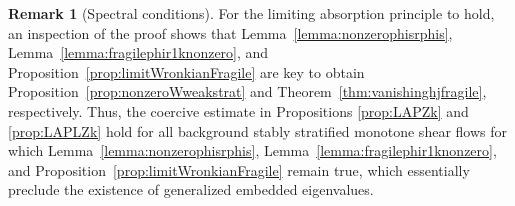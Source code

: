 \documentclass[11pt,reqno]{amsproc}
\theoremstyle{definition}
\newtheorem{remark}[proposition]{Remark}
\numberwithin{equation}{section}
\begin{document}
\begin{remark}[Spectral conditions]
For the limiting absorption principle to hold, an inspection of the proof shows that Lemma~\ref{lemma:nonzerophisrphis}, Lemma~\ref{lemma:fragilephir1knonzero}, and Proposition~\ref{prop:limitWronkianFragile} are key to obtain Proposition~\ref{prop:nonzeroWweakstrat} and Theorem~\ref{thm:vanishinghjfragile}, respectively. Thus, the coercive estimate in Propositions \ref{prop:LAPZk} and \ref{prop:LAPLZk} hold for all background stably stratified monotone shear flows for which Lemma~\ref{lemma:nonzerophisrphis}, Lemma~\ref{lemma:fragilephir1knonzero}, and Proposition~\ref{prop:limitWronkianFragile} remain true, which essentially preclude the existence of generalized embedded eigenvalues.
\end{remark}
\end{document}
